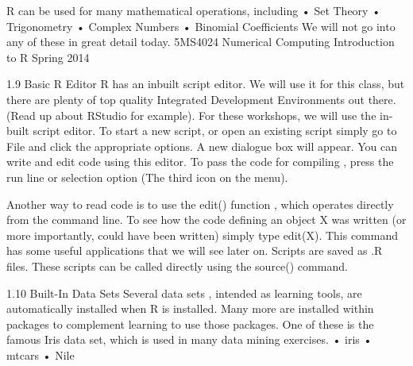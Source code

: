 \documentclass{beamer}
\begin{document}
\begin{frame}

R can be used for many mathematical operations, including
• Set Theory
• Trigonometry
• Complex Numbers
• Binomial Coefficients
We will not go into any of these in great detail today.
5MS4024 Numerical Computing Introduction to R Spring 2014
\end{frame}
\begin{frame}

1.9 Basic R Editor
R has an inbuilt script editor. We will use it for this class, but there are plenty of top quality
Integrated Development Environments out there. (Read up about RStudio for example).
For these workshops, we will use the in-built script editor.
To start a new script, or open an existing script simply go to File and click the appropriate
options. A new dialogue box will appear. You can write and edit code using this editor.
To pass the code for compiling , press the run line or selection option (The third icon
on the menu).

\end{frame}
\begin{frame}

Another way to read code is to use the edit() function , which operates directly from the
command line. To see how the code defining an object X was written (or more importantly,
could have been written) simply type edit(X). This command has some useful applications
that we will see later on.
Scripts are saved as .R files. These scripts can be called directly using the source() command.

\end{frame}
\begin{frame}


1.10 Built-In Data Sets
Several data sets , intended as learning tools, are automatically installed when R is installed.
Many more are installed within packages to complement learning to use those packages. One
of these is the famous Iris data set, which is used in many data mining exercises.
• iris
• mtcars
• Nile

\end{frame}
\end{document}
